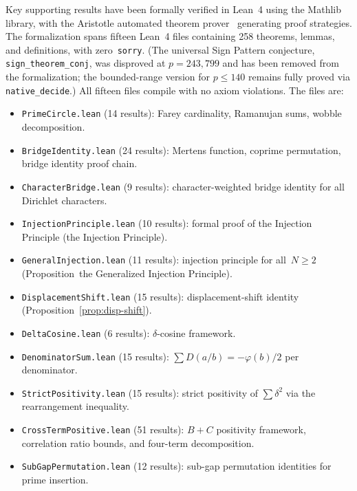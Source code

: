\documentclass[11pt]{article}
\theoremstyle{definition}
\begin{document}
Key supporting results have been formally verified in Lean~4
using the Mathlib library, with the Aristotle automated theorem
prover~\cite{Aristotle2025} generating proof strategies.
The formalization spans fifteen Lean~4 files containing 258
theorems, lemmas, and definitions, with
zero~\texttt{sorry}.  (The universal Sign Pattern conjecture,
\texttt{sign\_theorem\_conj}, was disproved at $p = 243{,}799$
and has been removed from the formalization; the bounded-range
version for $p \le 140$ remains fully proved via
\texttt{native\_decide}.)
All fifteen files compile with no axiom
violations.  The files are:
\begin{itemize}
  \item \texttt{PrimeCircle.lean} (14 results): Farey cardinality,
    Ramanujan sums, wobble decomposition.
  \item \texttt{BridgeIdentity.lean} (24 results): Mertens function,
    coprime permutation, bridge identity proof chain.
  \item \texttt{CharacterBridge.lean} (9 results): character-weighted
    bridge identity for all Dirichlet characters.
  \item \texttt{InjectionPrinciple.lean} (10 results): formal proof
    of the Injection Principle (the Injection Principle).
  \item \texttt{GeneralInjection.lean} (11 results): injection
    principle for all~$N \ge 2$ (Proposition~the Generalized Injection Principle).
  \item \texttt{DisplacementShift.lean} (15 results):
    displacement-shift identity
    (Proposition~\ref{prop:disp-shift}).
  \item \texttt{DeltaCosine.lean} (6 results):
    $\delta$-cosine framework.
  \item \texttt{DenominatorSum.lean} (15 results):
    $\sum D(a/b) = -\varphi(b)/2$ per denominator.
  \item \texttt{StrictPositivity.lean} (15 results):
    strict positivity of $\sum \delta^2$
    via the rearrangement inequality.
  \item \texttt{CrossTermPositive.lean} (51 results):
    $B + C$ positivity framework, correlation ratio bounds,
    and four-term decomposition.
  \item \texttt{SubGapPermutation.lean} (12 results):
    sub-gap permutation identities for prime insertion.


\end{itemize}
\end{document}
